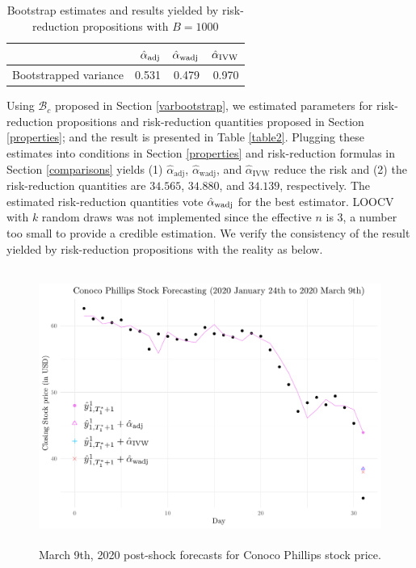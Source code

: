 \documentclass[11pt]{article}
\def\mc#1{\mathcal{#1}} %
\theoremstyle{definition}
\begin{document}
\begin{table}[H]
  \caption{Bootstrap estimates and results yielded by risk-reduction propositions with $B = 1000$}\label{table5}
  \begin{center}
    \begin{tabular}{lrrr}
      & $\hat{\alpha}_{\rm adj}$ & $\hat{\alpha}_{\rm wadj}$ & $\hat{\alpha}_{\rm IVW}$ \\
      \hline 
    Bootstrapped variance & 0.531 & 0.479 & 0.970 \\
    \end{tabular}
  \end{center}  
\end{table}
\vspace{-.5cm}

Using $\mc{B}_c$ proposed in Section \ref{varbootstrap}, we estimated parameters for risk-reduction propositions and risk-reduction quantities proposed in  Section \ref{properties}; and the result is presented in Table \ref{table2}. Plugging these estimates into conditions in Section \ref{properties} and risk-reduction formulas in Section \ref{comparisons} yields (1) $\hat{\alpha}_{\text{adj}}$, $\hat{\alpha}_{\text{wadj}}$, and $\hat{\alpha}_{\text{IVW}}$  reduce the risk and (2) the risk-reduction quantities are $34.565$, $34.880$, and $34.139$, respectively.  The estimated risk-reduction quantities  vote $\hat{\alpha}_{\rm wadj}$  for the best estimator. LOOCV with $k$ random draws was not implemented since the effective $n$ is $3$, a number too small to provide a credible estimation. We verify the consistency of the result yielded by risk-reduction propositions with the reality as below.

\begin{figure}
  \begin{center}
    \includegraphics[height = 9cm]{fig2.pdf}
    \caption{March 9th, 2020 post-shock forecasts for Conoco Phillips stock price.}
    \label{Fig:CP}
  \end{center}  
  \vspace{-.6cm}
\end{figure}
\end{document}
